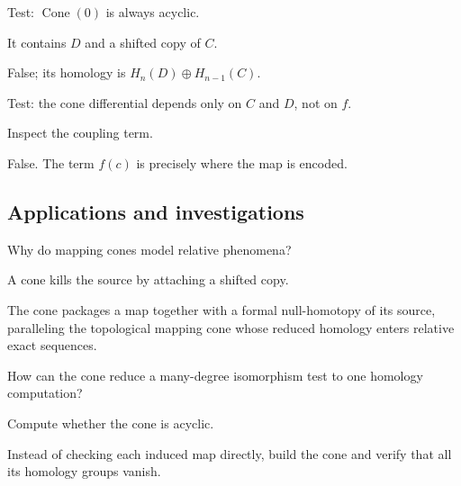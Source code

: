 \begin{exercise}\label{exr:viii24-ped-11}
Test: $\operatorname{Cone}(0)$ is always acyclic.
\end{exercise}
\begin{hint}
It contains $D$ and a shifted copy of $C$.
\end{hint}
\begin{solution}
False; its homology is $H_n(D)\oplus H_{n-1}(C)$.
\end{solution}

\begin{exercise}\label{exr:viii24-ped-12}
Test: the cone differential depends only on $C$ and $D$, not on $f$.
\end{exercise}
\begin{hint}
Inspect the coupling term.
\end{hint}
\begin{solution}
False. The term $f(c)$ is precisely where the map is encoded.
\end{solution}

\subsection*{Applications and investigations}

\begin{exercise}\label{exr:viii24-ped-13}
Why do mapping cones model relative phenomena?
\end{exercise}
\begin{hint}
A cone kills the source by attaching a shifted copy.
\end{hint}
\begin{solution}
The cone packages a map together with a formal null-homotopy of its source, paralleling the topological mapping cone whose reduced homology enters relative exact sequences.
\end{solution}

\begin{exercise}\label{exr:viii24-ped-14}
How can the cone reduce a many-degree isomorphism test to one homology computation?
\end{exercise}
\begin{hint}
Compute whether the cone is acyclic.
\end{hint}
\begin{solution}
Instead of checking each induced map directly, build the cone and verify that all its homology groups vanish.
\end{solution}

